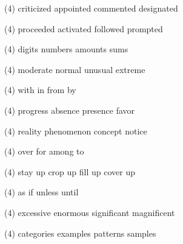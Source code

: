 \item
\begin{tasks}(4)
	\task criticized
	\task appointed
	\task commented
	\task designated
\end{tasks}
\item
\begin{tasks}(4)
	\task proceeded
	\task activated
	\task followed
	\task prompted
\end{tasks}
\item
\begin{tasks}(4)
	\task digits
	\task numbers
	\task amounts
	\task sums
\end{tasks}
\item
\begin{tasks}(4)
	\task moderate
	\task normal
	\task unusual
	\task extreme
\end{tasks}
\item
\begin{tasks}(4)
	\task with
	\task in
	\task from
	\task by
\end{tasks}
\item
\begin{tasks}(4)
	\task progress
	\task absence
	\task presence
	\task favor
\end{tasks}
\item
\begin{tasks}(4)
	\task reality
	\task phenomenon
	\task concept
	\task notice
\end{tasks}
\item
\begin{tasks}(4)
	\task over
	\task for
	\task among
	\task to
\end{tasks}
\item
\begin{tasks}(4)
	\task stay up
	\task crop up
	\task fill up
	\task cover up
\end{tasks}
\item
\begin{tasks}(4)
	\task as
	\task if
	\task unless
	\task until
\end{tasks}
\item
\begin{tasks}(4)
	\task excessive
	\task enormous
	\task significant
	\task magnificent
\end{tasks}
\item
\begin{tasks}(4)
	\task categories
	\task examples
	\task patterns
	\task samples
\end{tasks}
\item
